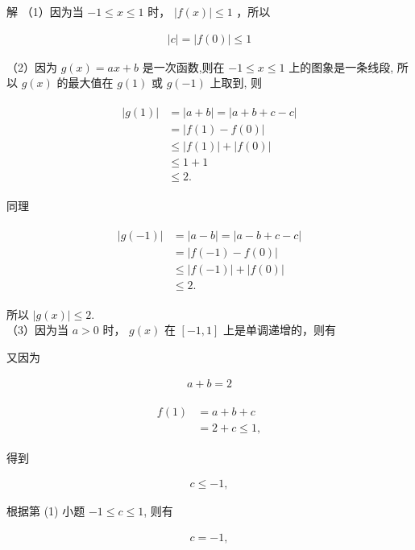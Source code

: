 \documentclass[10pt]{article}
\begin{document}
解 （1）因为当 $-1 \leqslant x \leqslant 1$ 时， $|f(x)| \leqslant 1$ ，所以

\begin{align*}
|c|=|f(0)| \leqslant 1
\end{align*}

（2）因为 $g(x)=a x+b$ 是一次函数,则在 $-1 \leqslant x \leqslant 1$ 上的图象是一条线段, 所以 $g(x)$ 的最大值在 $g(1)$ 或 $g(-1)$ 上取到, 则

\begin{align*}
\begin{aligned}
|g(1)| & =|a+b|=|a+b+c-c| \\
& =|f(1)-f(0)| \\
& \leqslant|f(1)|+|f(0)| \\
& \leqslant 1+1 \\
& \leqslant 2 .
\end{aligned}
\end{align*}

同理

\begin{align*}
\begin{aligned}
|g(-1)| & =|a-b|=|a-b+c-c| \\
& =|f(-1)-f(0)| \\
& \leqslant|f(-1)|+|f(0)| \\
& \leqslant 2 .
\end{aligned}
\end{align*}

所以 $|g(x)| \leqslant 2$.\\
（3）因为当 $a>0$ 时， $g(x)$ 在 $[-1,1]$ 上是单调递增的，则有

又因为

\begin{align*}
a+b=2
\end{align*}

\begin{align*}
\begin{aligned}
f(1) & =a+b+c \\
& =2+c \leqslant 1,
\end{aligned}
\end{align*}

得到

\begin{align*}
c \leqslant-1,
\end{align*}

根据第 (1) 小题 $-1 \leqslant c \leqslant 1$, 则有

\begin{align*}
c=-1,
\end{align*}
\end{document}
